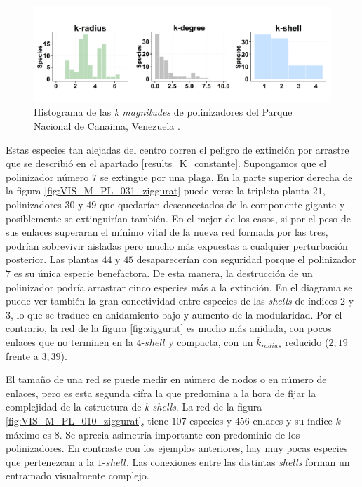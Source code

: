 \begin{figure}[ht!]
\centering
\includegraphics[scale=0.5]{Figures/VIS_M_PL_031_polar.png}
\caption {Histograma de las \textit{k magnitudes} de polinizadores del Parque Nacional de Canaima, Venezuela \cite{ramirez1989biologia}.}
\label{fig:VIS_M_PL_031_polar}
\end{figure}

Estas especies tan alejadas del centro corren el peligro de extinción por arrastre que se describió en el apartado \ref{results_K_constante}. Supongamos que el polinizador número $7$ se extingue por una plaga. En la parte superior derecha de la figura \ref{fig:VIS_M_PL_031_ziggurat} puede verse la tripleta planta $21$, polinizadores $30$ y $49$ que quedarían desconectados de la componente gigante y posiblemente se extinguirían también. En el mejor de los casos, si por el peso de sus enlaces superaran el mínimo vital de la nueva red formada por las tres, podrían sobrevivir aisladas pero mucho más expuestas a cualquier perturbación posterior. Las plantas $44$ y $45$ desaparecerían con seguridad porque el polinizador $7$ es su única especie benefactora. De esta manera, la destrucción de un polinizador podría arrastrar cinco especies más a la extinción. En el diagrama se puede ver también la gran conectividad entre especies de las \textit{shells} de índices $2$ y $3$, lo que se traduce en anidamiento bajo y aumento de la modularidad. Por el contrario, la red de la figura \ref{fig:ziggurat} es mucho más anidada, con pocos enlaces que no terminen en la $4$-$shell$ y compacta, con un $\overline k_{radius}$ reducido ($2,19$ frente a $3,39$).


El tamaño de una red se puede medir en número de nodos o en número de enlaces, pero es esta segunda cifra la que predomina a la hora de fijar la complejidad de la estructura de \textit{k shells}. La red de la figura \ref{fig:VIS_M_PL_010_ziggurat}, tiene $107$ especies y $456$ enlaces y su índice $k$ máximo es $8$. Se aprecia asimetría importante con predominio de los polinizadores. En contraste con los ejemplos anteriores, hay muy pocas especies que pertenezcan a la $1$-$shell$. Las conexiones entre las distintas \textit{shells} forman un entramado visualmente complejo.

